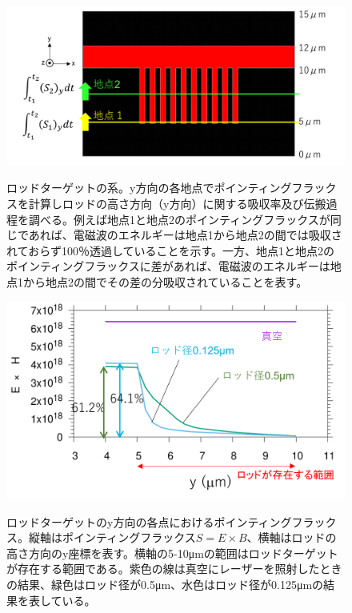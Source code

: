 \documentclass[a4paper,11pt,titlepage]{jarticle}
\numberwithin{equation}{section} %
\begin{document}
    \begin{figure}[H]
      \begin{center}
        \includegraphics[scale=0.4]{./image/4-26.png}
        \label{fig:4-26}
        \caption{ロッドターゲットの系。y方向の各地点でポインティングフラックスを計算しロッドの高さ方向（y方向）に関する吸収率及び伝搬過程を調べる。例えば地点1と地点2のポインティングフラックスが同じであれば、電磁波のエネルギーは地点1から地点2の間では吸収されておらず100％透過していることを示す。一方、地点1と地点2のポインティングフラックスに差があれば、電磁波のエネルギーは地点1から地点2の間でその差の分吸収されていることを表す。}
      \end{center}
    \end{figure}
    
    
    \begin{figure}[H]
      \begin{center}
        \includegraphics[scale=1]{./image/4-27.png}
        \label{fig:4-27}
        \caption{ロッドターゲットのy方向の各点におけるポインティングフラックス。縦軸はポインティングフラックス$S=E \times B$、横軸はロッドの高さ方向のy座標を表す。横軸の5-10μmの範囲はロッドターゲットが存在する範囲である。紫色の線は真空にレーザーを照射したときの結果、緑色はロッド径が0.5μm、水色はロッド径が0.125μmの結果を表している。}
      \end{center}
    \end{figure}
    
\end{document}
